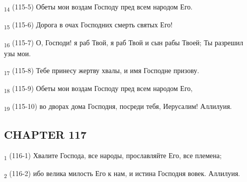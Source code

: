 \begin{tcolorbox}
\textsubscript{14} (115-5) Обеты мои воздам Господу пред всем народом Его.
\end{tcolorbox}
\begin{tcolorbox}
\textsubscript{15} (115-6) Дорога в очах Господних смерть святых Его!
\end{tcolorbox}
\begin{tcolorbox}
\textsubscript{16} (115-7) О, Господи! я раб Твой, я раб Твой и сын рабы Твоей; Ты разрешил узы мои.
\end{tcolorbox}
\begin{tcolorbox}
\textsubscript{17} (115-8) Тебе принесу жертву хвалы, и имя Господне призову.
\end{tcolorbox}
\begin{tcolorbox}
\textsubscript{18} (115-9) Обеты мои воздам Господу пред всем народом Его,
\end{tcolorbox}
\begin{tcolorbox}
\textsubscript{19} (115-10) во дворах дома Господня, посреди тебя, Иерусалим! Аллилуия.
\end{tcolorbox}
\subsection{CHAPTER 117}
\begin{tcolorbox}
\textsubscript{1} (116-1) Хвалите Господа, все народы, прославляйте Его, все племена;
\end{tcolorbox}
\begin{tcolorbox}
\textsubscript{2} (116-2) ибо велика милость Его к нам, и истина Господня вовек. Аллилуия.
\end{tcolorbox}
